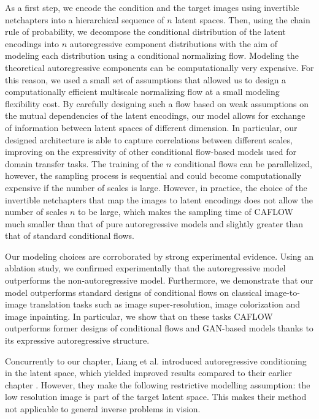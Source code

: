 As a first step, we encode the condition and the target images using invertible netchapters into a hierarchical sequence of $n$ latent spaces. Then, using the chain rule of probability, we decompose the conditional distribution of the latent encodings into $n$ autoregressive component distributions with the aim of modeling each distribution using a conditional normalizing flow. Modeling the theoretical autoregressive components can be computationally very expensive. For this reason, we used a small set of assumptions that allowed us to design a computationally efficient multiscale normalizing flow at a small modeling flexibility cost. By carefully designing such a flow based on weak assumptions on the mutual dependencies of the latent encodings, our model allows for exchange of information between latent spaces of different dimension. In particular, our designed architecture is able to capture correlations between different scales, improving on the expressivity of other conditional flow-based models used for domain transfer tasks. The training of the $n$ conditional flows can be parallelized, however, the sampling process is sequential and could become computationally expensive if the number of scales is large. However, in practice, the choice of the invertible netchapters that map the images to latent encodings does not allow the number of scales $n$ to be large, which makes the sampling time of CAFLOW much smaller than that of pure autoregressive models and slightly greater than that of standard conditional flows.

Our modeling choices are corroborated by strong experimental evidence. Using an ablation study, we confirmed experimentally that the autoregressive model outperforms the non-autoregressive model. Furthermore, we demonstrate that our model outperforms standard designs of conditional flows on classical image-to-image translation tasks such as image super-resolution, image colorization and image inpainting. In particular, we show that on these tasks CAFLOW outperforms former designs of conditional flows and GAN-based models thanks to its expressive autoregressive structure.

Concurrently to our chapter, Liang et al. \cite{HCFLOW} introduced autoregressive conditioning in the latent space, which yielded improved results compared to their earlier chapter \cite{SRFLOW}. 
However, they make the following restrictive modelling assumption: the low resolution image is part of the target latent space.  This makes their method not applicable to general inverse problems in vision. 

